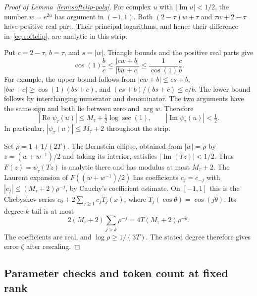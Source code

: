 \documentclass[11pt]{article}
\theoremstyle{definition}
\theoremstyle{remark}
\begin{document}
\begin{proof}[Proof of Lemma~\ref{lem:softclip-poly}]
For complex $u$ with $|\operatorname{Im}u|<1/2$, the number $w=e^{2u}$ has argument in $(-1,1)$. Both $(2-\tau)w+\tau$ and $\tau w+2-\tau$ have positive real part. Their principal logarithms, and hence their difference in~\eqref{eq:softclip}, are analytic in this strip.

Put $c=2-\tau$, $b=\tau$, and $s=|w|$. Triangle bounds and the positive real parts give
\[
\cos(1)\frac bc
\le\frac{|cw+b|}{|bw+c|}
\le\frac1{\cos(1)}\frac cb.
\]
For example, the upper bound follows from
$|cw+b|\le cs+b$, $|bw+c|\ge\cos(1)(bs+c)$, and
$(cs+b)/(bs+c)\le c/b$. The lower bound follows by interchanging numerator and denominator. The two arguments have the same sign and both lie between zero and $\arg w$. Therefore
\[
|\operatorname{Re}\psi_\tau(u)|
\le M_\tau+\tfrac12\log\sec(1),
\qquad
|\operatorname{Im}\psi_\tau(u)|<\tfrac12.
\]
In particular, $|\psi_\tau(u)|\le M_\tau+2$ throughout the strip.

Set $\rho=1+1/(2T)$. The Bernstein ellipse, obtained from $|w|=\rho$ by $z=(w+w^{-1})/2$ and taking its interior, satisfies
$|\operatorname{Im}(Tz)|<1/2$. Thus $F(z)=\psi_\tau(Tz)$ is analytic there and has modulus at most $M_\tau+2$. The Laurent expansion of $F((w+w^{-1})/2)$ has coefficients $c_j=c_{-j}$ with
$|c_j|\le(M_\tau+2)\rho^{-j}$, by Cauchy's coefficient estimate. On $[-1,1]$ this is the Chebyshev series
$c_0+2\sum_{j\ge1}c_jT_j(x)$, where $T_j(\cos\theta)=\cos(j\theta)$. Its degree-$k$ tail is at most
\[
2(M_\tau+2)\sum_{j>k}\rho^{-j}
=4T(M_\tau+2)\rho^{-k}.
\]
The coefficients are real, and $\log\rho\ge1/(3T)$. The stated degree therefore gives error $\zeta$ after rescaling.
\end{proof}

\subsection{Parameter checks and token count at fixed rank}\label{sec:smooth-parameter-check}
\end{document}
